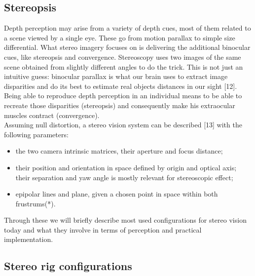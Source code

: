 \subsection{Stereopsis}
Depth perception may arise from a variety of depth cues, most of them related to a scene viewed by a single eye. These go from motion parallax to simple size differential. What stereo imagery focuses on is delivering the additional binocular cues, like stereopsis and convergence. Stereoscopy uses two images of the same scene obtained from slightly different angles to do the trick. This is not just an intuitive guess: binocular parallax is what our brain uses to extract image disparities and do its best to estimate real objects distances in our sight [12]. Being able to reproduce depth perception in an individual means to be able to recreate those disparities (stereopsis) and consequently make his extraocular muscles contract (convergence).\\
Assuming null distortion, a stereo vision system can be described [13] with the following parameters:
\begin{itemize}
\item the two camera intrinsic matrices, their aperture and focus distance;
\item their position and orientation in space defined by origin and optical axis; their separation and yaw angle is mostly relevant for stereoscopic effect;
\item epipolar lines and plane, given a chosen point in space within both frustrums(*).
\end{itemize}
Through these we will briefly describe most used configurations for stereo vision today and what they involve in terms of perception and practical implementation.

\subsection{Stereo rig configurations}


